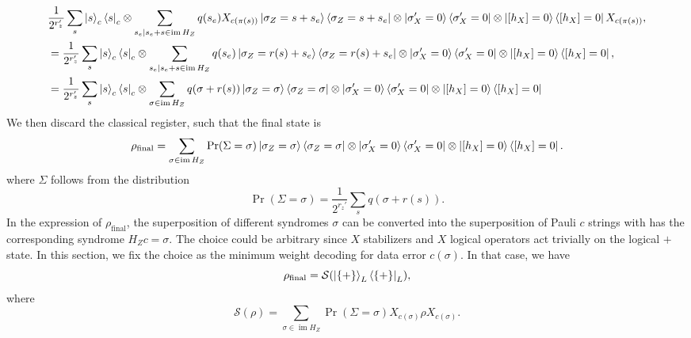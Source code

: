 \documentclass[twoside,english,aps,showpacs,pra,superscriptaddress]{revtex4-2}
\DeclareMathOperator{\im}{im}
\begin{document}
    \begin{equation}
    \begin{aligned}
        & \frac{1}{2^{r_z'}}\sum_s  \ket{s}_c\bra{s}_c \otimes  \sum_{s_e|s_e+s\in \im H_Z}  q(s_e) X_{c(\pi(s))} \ket{\sigma_{Z} = s+s_e}\bra{\sigma_{Z} = s+s_e}  \otimes \ket{\sigma_{X}' = 0}\bra{\sigma_{X}' = 0} \otimes \ket{[h_X]=0}\bra{[h_X]=0} X_{c(\pi(s))},\\
        &=\frac{1}{2^{r_z'}}\sum_s  \ket{s}_c\bra{s}_c \otimes  \sum_{s_e|s_e+s\in \im H_Z}  q(s_e) \ket{\sigma_{Z} = r(s)+s_e}\bra{\sigma_{Z} = r(s)+s_e}  \otimes \ket{\sigma_{X}' = 0}\bra{\sigma_{X}' = 0} \otimes \ket{[h_X]=0}\bra{[h_X]=0},\\
        &=\frac{1}{2^{r_z'}}\sum_s  \ket{s}_c\bra{s}_c \otimes  \sum_{\sigma \in \im H_Z}  q(\sigma+r(s)) \ket{\sigma_{Z} = \sigma}\bra{\sigma_{Z} = \sigma}  \otimes \ket{\sigma_{X}' = 0}\bra{\sigma_{X}' = 0} \otimes \ket{[h_X]=0}\bra{[h_X]=0}
    \end{aligned}
    \end{equation}
We then discard the classical register, such that the final state is 
\begin{equation}
        \rho_{\text{final}}= \sum_{\sigma \in \im H_Z}  \Pr(\Sigma = \sigma)\ket{\sigma_{Z} = \sigma}\bra{\sigma_{Z} = \sigma}  \otimes \ket{\sigma_{X}' = 0}\bra{\sigma_{X}' = 0} \otimes \ket{[h_X]=0}\bra{[h_X]=0}.
\end{equation}
where $\Sigma$ follows from the distribution
\begin{equation}
     \Pr(\Sigma = \sigma) = \frac{1}{2^{r_z'}}\sum_s q(\sigma+r(s)) .
\end{equation}
In the expression of $\rho_{\text{final}}$, the superposition of different syndromes $\sigma$ can be converted into the superposition of Pauli $c$ strings with has the corresponding syndrome $H_Z c = \sigma$. The choice could be arbitrary since $X$ stabilizers and $X$ logical operators act trivially on the logical $+$ state. In this section, we fix the choice as the minimum weight decoding for data error $c(\sigma)$. In that case, we have
\begin{equation}
    \rho_{\text{final}} = \mathcal{S}(\ket{\{+\}}_L \bra{\{+\}}_L ),
\end{equation}
where
\begin{equation}
    \mathcal{S}(\rho ) = \sum_{\sigma \in \im H_Z} \Pr(\Sigma = \sigma)  X_{c(\sigma)} \rho X_{c(\sigma)}.
\end{equation}
\end{document}
